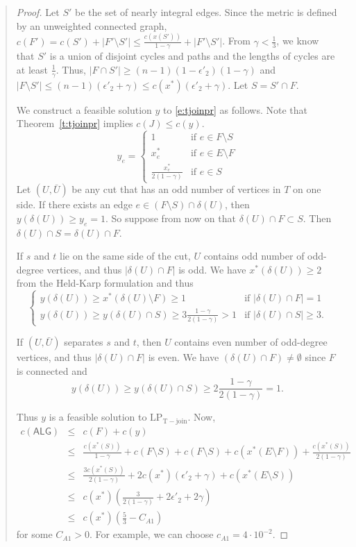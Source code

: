 \documentclass[11pt,letterpaper]{article}
\begin{document}
\begin{quote}
\begin{proof}
Let $S'$ be the set of nearly integral edges. Since the metric is defined by an unweighted connected graph, $c(F')=c(S')+|F'\setminus S'|\leq\frac{c(x(S'))}{1-\gamma}+|F'\setminus S'|$. From $\gamma<\frac{1}{3}$, we know that $S'$ is a union of disjoint cycles and paths and the lengths of cycles are at least $\frac{1}{\gamma}$. Thus, $|F\cap S'|\geq (n-1)(1-\epsilon'_2)(1-\gamma)$ and $|F\setminus S'|\leq (n-1)(\epsilon'_2+\gamma)\leq c(x^*)(\epsilon'_2+\gamma)$. Let $S=S'\cap F$.

We construct a feasible solution $y$ to \eqref{e:tjoinpr} as follows. Note that Theorem~\ref{t:tjoinpr} implies $c(J)\leq c(y)$.\[
y_e = \begin{cases}
1&\textrm{if }e\in F\setminus S\\
x_e^*&\textrm{if }e\in E\setminus F\\
\frac{x_e^*}{2(1-\gamma)}&\textrm{if }e\in S
\end{cases}
\]Let $(U,\bar U)$ be any cut that has an odd number of vertices in $T$ on one side. If there exists an edge $e\in (F\setminus S)\cap \delta(U)$, then $y(\delta(U))\geq y_e = 1$. So suppose from now on that $\delta(U)\cap F\subset S$. Then $\delta(U)\cap S=\delta(U)\cap F$.

If $s$ and $t$ lie on the same side of the cut, $U$ contains odd number of odd-degree vertices, and thus $|\delta(U)\cap F|$ is odd. We have $x^*(\delta(U))\geq 2$ from the Held-Karp formulation and thus\[
\begin{cases}
y(\delta(U))\geq x^*(\delta(U)\setminus F)\geq 1&\textrm{if }|\delta(U)\cap F|=1\\
y(\delta(U))\geq y(\delta(U)\cap S)\geq 3\frac{1-\gamma}{2(1-\gamma)} > 1&\textrm{if }|\delta(U)\cap S|\geq 3
.\end{cases}
\]

If $(U,\bar U)$ separates $s$ and $t$, then $U$ contains even number of odd-degree vertices, and thus $|\delta(U)\cap F|$ is even. We have $(\delta(U)\cap F)\neq\emptyset$ since $F$ is connected and\[
y(\delta(U))\geq y(\delta(U)\cap S)\geq 2\frac{1-\gamma}{2(1-\gamma)}=1
.\]

Thus $y$ is a feasible solution to $\mathrm{LP_{T-join}}$. Now,\begin{eqnarray*}
c(\mathsf{ALG})&\leq&c(F)+c(y)\\
&\leq&\frac{c(x^*(S))}{1-\gamma}+c(F\setminus S)+c(F\setminus S)+c(x^*(E\setminus F))+\frac{c(x^*(S))}{2(1-\gamma)}\\
&\leq&\frac{3c(x^*(S))}{2(1-\gamma)}+2c(x^*)(\epsilon'_2+\gamma)+c(x^*(E\setminus S))\\
&\leq&c(x^*)(\frac{3}{2(1-\gamma)}+2\epsilon'_2+2\gamma)\\
&\leq&c(x^*)(\frac{5}{3}-C_{A1})
\end{eqnarray*}for some $C_{A1}>0$. For example, we can choose $c_{A1}=4\cdot 10^{-2}$.
\end{proof}


\end{quote}
\end{document}
